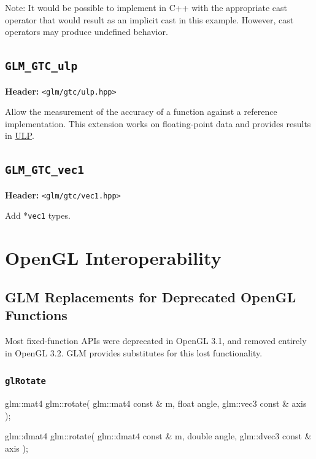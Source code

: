 \documentclass{scrartcl}
\numberwithin{figure}{subsection}
\begin{document}
Note: It would be possible to implement  in C++ with the appropriate cast operator that would result as an implicit cast in this example. However, cast operators may produce undefined behavior.

\subsection{\texttt{GLM\_GTC\_ulp}}
\textbf{Header:} \verb|<glm/gtc/ulp.hpp>|

Allow the measurement of the accuracy of a function against a reference implementation. This extension works on floating-point data and provides results in \href{http://ljk.imag.fr/membres/Carine.Lucas/TPScilab/JMMuller/ulp-toms.pdf}{ULP}.

\subsection{\texttt{GLM\_GTC\_vec1}}
\textbf{Header:} \verb|<glm/gtc/vec1.hpp>|

Add *\verb|vec1| types.

\newpage{}

\section{OpenGL Interoperability}

\subsection{GLM Replacements for Deprecated OpenGL Functions}

Most fixed-function APIs were deprecated in OpenGL 3.1, and removed entirely in OpenGL 3.2.  GLM provides substitutes for this lost functionality.

\subsubsection{\texttt{glRotate}}

\begin{cppcode}
glm::mat4 glm::rotate(
  glm::mat4 const & m,
  float angle, 
  glm::vec3 const & axis
);

glm::dmat4 glm::rotate(
  glm::dmat4 const & m,
  double angle, 
  glm::dvec3 const & axis
);
\end{cppcode}
\end{document}
